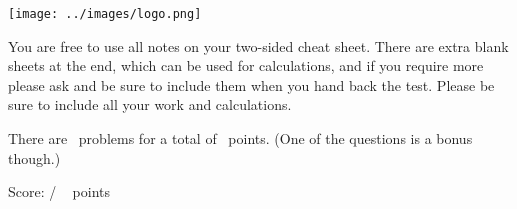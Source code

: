 \documentclass[addpoints,12pt]{exam}
\begin{document}

\begin{flushright}
\vspace{0.2in}

\end{flushright}

\begin{center}
\texttt{[image: ../images/logo.png]}
\end{center}

\begin{center}
\end{center}

\vspace{0.5in}

\begin{large}
You are free to use all notes on your two-sided cheat sheet. There are extra blank sheets at the end, which can be used for calculations, and if you require more please ask and be sure to include them when you hand back the test. Please be sure to include all your work and calculations.

There are \numquestions~problems for a total of \numpoints~points. (One of the questions is a bonus though.)
\end{large}
\vspace{0.2in}


 
\clearpage

\begin{flushright}
Score: \hspace{0.2in} / \numpoints ~ points
\end{flushright}
\end{document}
